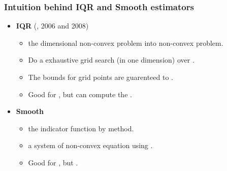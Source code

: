 \documentclass[11pt]{beamer}
\begin{document}
\begin{frame}
  \frametitle{Intuition behind IQR and Smooth estimators}

  \begin{itemize}
    \item {\bf IQR} (\citeauthor{chernozhukov2006}, 2006 and 2008)
    \setlength\itemsep{0.8em}

      \begin{itemize}
    \setlength\itemsep{0.5em}
	\item {} the 
	  dimensional non-convex problem into 
	  non-convex problem.

	\item Do a exhaustive grid search (in one dimension) over
	  .
	
	\item The bounds for grid points are guarenteed to .
	
	\item Good for , but can compute the
	  .
      \end{itemize}

    \item {\bf Smooth} \citep{kaplan2017}
      \begin{itemize}
    \setlength\itemsep{0.5em}
    \item {} the indicator function by  method.
    \item {} a system of non-convex equation using 
      .
    \item Good for , but .
  \end{itemize}
  \end{itemize}
\end{frame}
\end{document}
